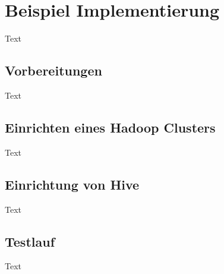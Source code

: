 \newpage
\section{Beispiel Implementierung}
Text

\subsection{Vorbereitungen}
Text

\subsection{Einrichten eines Hadoop Clusters}
Text

\subsection{Einrichtung von Hive}
Text

\subsection{Testlauf}
Text
